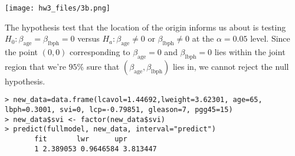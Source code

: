 \documentclass{article}
\begin{document}
\texttt{[image: hw3\_files/3b.png]}

The hypothesis test that the location of the origin informs us about is testing $H_0:\beta_\text{age}=\beta_\text{lbph}=0$ versus $H_a:\beta_\text{age}\neq0\text{ or }\beta_\text{lbph}\neq0$ at the $\alpha=0.05$ level. Since the point $(0,0)$ corresponding to $\beta_\text{age}=0$ and $\beta_\text{lbph}=0$ lies within the joint region that we're $95\%$ sure that $(\beta_\text{age},\beta_\text{lbph})$ lies in, we cannot reject the null hypothesis.
\begin{verbatim}
> new_data=data.frame(lcavol=1.44692,lweight=3.62301, age=65, lbph=0.3001, svi=0, lcp=-0.79851, gleason=7, pgg45=15)
> new_data$svi <- factor(new_data$svi)
> predict(fullmodel, new_data, interval="predict")
       fit       lwr      upr
       1 2.389053 0.9646584 3.813447
\end{verbatim}
\end{document}
